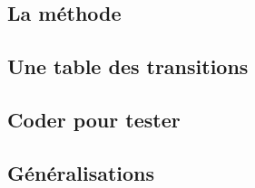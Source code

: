 \subsection{La méthode}

	


\subsection{Une table des transitions}

	


\subsection{Coder pour tester}

	


\subsection{Généralisations}

	
